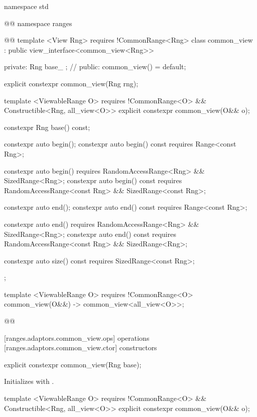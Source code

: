 \begin{codeblock}
namespace std { @@ namespace ranges { @@
  template <View Rng>
    requires !CommonRange<Rng>
  class common_view : public view_interface<common_view<Rng>> {
  private:
    Rng base_ {}; // \expos
  public:
    common_view() = default;

    explicit constexpr common_view(Rng rng);

    template <ViewableRange O>
      requires !CommonRange<O> && Constructible<Rng, all_view<O>>
    explicit constexpr common_view(O&& o);

    constexpr Rng base() const;

    constexpr auto begin();
    constexpr auto begin() const requires Range<const Rng>;

    constexpr auto begin()
      requires RandomAccessRange<Rng> && SizedRange<Rng>;
    constexpr auto begin() const
      requires RandomAccessRange<const Rng> && SizedRange<const Rng>;

    constexpr auto end();
    constexpr auto end() const requires Range<const Rng>;

    constexpr auto end()
      requires RandomAccessRange<Rng> && SizedRange<Rng>;
    constexpr auto end() const
      requires RandomAccessRange<const Rng> && SizedRange<Rng>;

    constexpr auto size() const requires SizedRange<const Rng>;
  };

  template <ViewableRange O>
    requires !CommonRange<O>
  common_view(O&&) -> common_view<all_view<O>>;
}}@\removed{\}\}}@
\end{codeblock}

[ranges.adaptors.common_view.ops]{ operations}
[ranges.adaptors.common_view.ctor]{ constructors}

%
\begin{itemdecl}
explicit constexpr common_view(Rng base);
\end{itemdecl}

\begin{itemdescr}
\pnum
\effects Initializes  with .
\end{itemdescr}

%
\begin{itemdecl}
template <ViewableRange O>
  requires !CommonRange<O> && Constructible<Rng, all_view<O>>
explicit constexpr common_view(O&& o);
\end{itemdecl}


